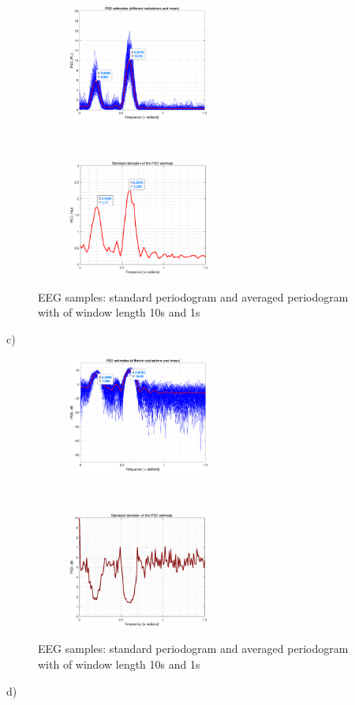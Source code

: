 \begin{figure}[H]
    \centering
    \begin{subfigure}{0.35\textwidth}
        \centering
        \includegraphics[height=1.5in]{Part1/1_3_b_1.eps}
    \end{subfigure}
    ~ 
    \begin{subfigure}{0.35\textwidth}
        \centering
        \includegraphics[height=1.5in]{Part1/1_3_b_2.eps}
    \end{subfigure}
    \caption{EEG samples: standard periodogram and averaged  periodogram with of window length 10s and 1s}
    \label{fig:1_2_b_2}
\end{figure}
c)
\begin{figure}[H]
    \centering
    \begin{subfigure}{0.35\textwidth}
        \centering
        \includegraphics[height=1.5in]{Part1/1_3_c_1.eps}
    \end{subfigure}
    ~ 
    \begin{subfigure}{0.35\textwidth}
        \centering
        \includegraphics[height=1.5in]{Part1/1_3_c_2.eps}
    \end{subfigure}
    \caption{EEG samples: standard periodogram and averaged  periodogram with of window length 10s and 1s}
    \label{fig:1_3_c}
\end{figure}
d)

